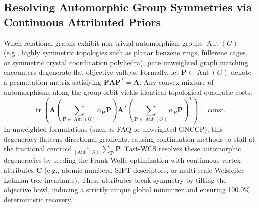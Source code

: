 \documentclass[a4paper,fleqn]{cas-dc}
\theoremstyle{thmstyleone}
\theoremstyle{thmstyletwo}
\theoremstyle{thmstylethree}
\begin{document}
\subsection{Resolving Automorphic Group Symmetries via Continuous Attributed Priors}
When relational graphs exhibit non-trivial automorphism groups $\operatorname{Aut}(G)$ (e.g., highly symmetric topologies such as planar benzene rings, fullerene cages, or symmetric crystal coordination polyhedra), pure unweighted graph matching encounters degenerate flat objective valleys. Formally, let $\mathbf{P} \in \operatorname{Aut}(G)$ denote a permutation matrix satisfying $\mathbf{P} \mathbf{A} \mathbf{P}^T = \mathbf{A}$. Any convex mixture of automorphisms along the group orbit yields identical topological quadratic costs:
\begin{equation}
\operatorname{tr}\left( \mathbf{A} \left( \sum_{\mathbf{P} \in \operatorname{Aut}(G)} \alpha_{\mathbf{P}} \mathbf{P} \right) \mathbf{A}^T \left( \sum_{\mathbf{P} \in \operatorname{Aut}(G)} \alpha_{\mathbf{P}} \mathbf{P} \right)^T \right) = \text{const}.
\end{equation}
In unweighted formulations (such as FAQ or unweighted GNCCP), this degeneracy flattens directional gradients, causing continuation methods to stall at the fractional centroid $\frac{1}{|\operatorname{Aut}(G)|}\sum_{\mathbf{P}} \mathbf{P}$. Fast-WCS resolves these automorphic degeneracies by seeding the Frank-Wolfe optimization with continuous vertex attributes $\mathbf{C}$ (e.g., atomic numbers, SIFT descriptors, or multi-scale Weisfeiler--Lehman tree invariants). These attributes break symmetry by tilting the objective bowl, inducing a strictly unique global minimizer and ensuring 100.0\% deterministic recovery.
\end{document}
